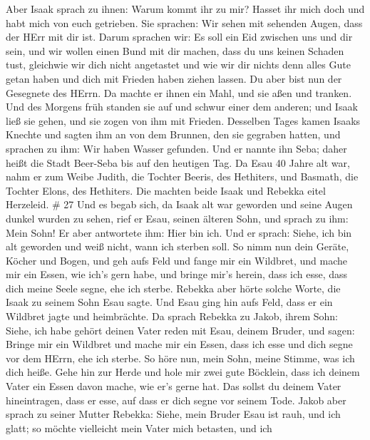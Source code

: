  Aber Isaak sprach zu ihnen: Warum kommt ihr zu mir? Hasset
ihr mich doch und habt mich von euch getrieben.  Sie
sprachen: Wir sehen mit sehenden Augen, dass der HErr mit dir ist. Darum
sprachen wir: Es soll ein Eid zwischen uns und dir sein, und wir wollen
einen Bund mit dir machen,  dass du uns keinen Schaden
tust, gleichwie wir dich nicht angetastet und wie wir dir nichts denn
alles Gute getan haben und dich mit Frieden haben ziehen lassen. Du aber
bist nun der Gesegnete des HErrn.  Da machte er ihnen ein
Mahl, und sie aßen und tranken.  Und des Morgens früh
standen sie auf und schwur einer dem anderen; und Isaak ließ sie gehen,
und sie zogen von ihm mit Frieden.  Desselben Tages kamen
Isaaks Knechte und sagten ihm an von dem Brunnen, den sie gegraben
hatten, und sprachen zu ihm: Wir haben Wasser gefunden. 
Und er nannte ihn Seba; daher heißt die Stadt Beer-Seba bis auf den
heutigen Tag.  Da Esau 40 Jahre alt war, nahm er zum Weibe
Judith, die Tochter Beeris, des Hethiters, und Basmath, die Tochter
Elons, des Hethiters.  Die machten beide Isaak und Rebekka
eitel Herzeleid. \# 27  Und es begab sich, da Isaak alt war
geworden und seine Augen dunkel wurden zu sehen, rief er Esau, seinen
älteren Sohn, und sprach zu ihm: Mein Sohn! Er aber antwortete ihm: Hier
bin ich.  Und er sprach: Siehe, ich bin alt geworden und
weiß nicht, wann ich sterben soll.  So nimm nun dein Geräte,
Köcher und Bogen, und geh aufs Feld und fange mir ein Wildbret,
 und mache mir ein Essen, wie ich's gern habe, und bringe
mir's herein, dass ich esse, dass dich meine Seele segne, ehe ich
sterbe.  Rebekka aber hörte solche Worte, die Isaak zu
seinem Sohn Esau sagte. Und Esau ging hin aufs Feld, dass er ein
Wildbret jagte und heimbrächte.  Da sprach Rebekka zu Jakob,
ihrem Sohn: Siehe, ich habe gehört deinen Vater reden mit Esau, deinem
Bruder, und sagen:  Bringe mir ein Wildbret und mache mir
ein Essen, dass ich esse und dich segne vor dem HErrn, ehe ich sterbe.
 So höre nun, mein Sohn, meine Stimme, was ich dich heiße.
 Gehe hin zur Herde und hole mir zwei gute Böcklein, dass
ich deinem Vater ein Essen davon mache, wie er's gerne hat.
 Das sollst du deinem Vater hineintragen, dass er esse, auf
dass er dich segne vor seinem Tode.  Jakob aber sprach zu
seiner Mutter Rebekka: Siehe, mein Bruder Esau ist rauh, und ich glatt;
 so möchte vielleicht mein Vater mich betasten, und ich
